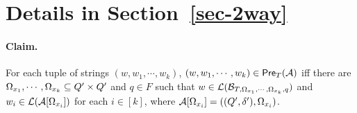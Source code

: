 
\section{Details in Section~\ref{sec-2way}} \label{appendix:sec-2way}

\paragraph{Claim.} For each tuple of strings $(w, w_1,\cdots, w_k)$, $(w, w_1,\cdots, w_k) \in \textsf{Pre}_{T}(\mathcal{A})$ iff there are $\Omega_{x_1}, \cdots, \Omega_{x_k} \subseteq Q' \times Q'$ and $q \in F$ such that $w \in \mathcal{L}(\mathcal{B}_{T, \Omega_{x_1}, \cdots, \Omega_{x_k}, q})$ and $w_i \in \mathcal{L}(\mathcal{A}[\Omega_{x_i}])$ for each $i \in [k]$, where $\mathcal{A}[\Omega_{x_i}]=((Q', \delta'), \Omega_{x_i})$.


